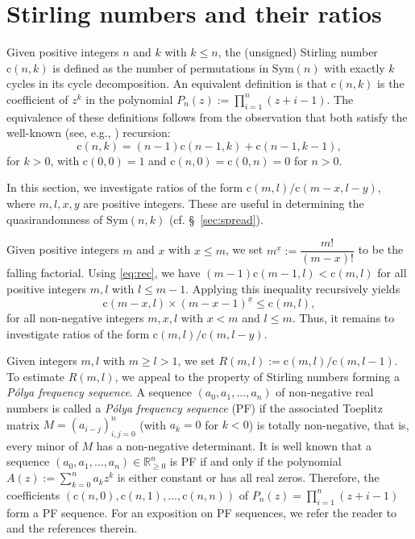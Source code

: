 \documentclass{amsart}
\newcommand{\bb}{\mathbb}
\newcommand{\sym}{\mathrm{Sym}}
\newcommand{\st}{\mathrm{c}}
\newcommand{\ff}[1]{^{\underline{#1}}}
\begin{document}
\section{Stirling numbers and their ratios}\label{sec:stirling}
Given positive integers $n$ and $k$ with $k\leq n$, the (unsigned) Stirling number $\st(n,k)$ is defined as the number of permutations in $\sym(n)$ with exactly $k$ cycles in its cycle decomposition. An equivalent definition is that $\st(n,k)$ is the coefficient of $z^{k}$ in the polynomial $P_{n}(z):=\prod\limits_{i=1}^{n}(z+i-1)$. The equivalence of these definitions follows from the observation that both satisfy the well-known (see, e.g., \cite[Lemma 1.3.6]{stanley2011enumerative}) recursion:
\begin{equation}\label{eq:rec}
\st(n,k) = (n-1)\st(n-1,k) + \st(n-1,k-1),     
\end{equation}
for $k>0$, with $\st(0,0)=1$ and $\st(n,0)=\st(0,n)=0$ for $n>0$.

In this section, we investigate ratios of the form $\st(m,l)/\st(m-x,l-y)$, where $m,l,x,y$ are positive integers. These are useful in determining the quasirandomness of $\sym(n,k)$ (cf. \S~\ref{sec:spread}).

Given positive integers $m$ and $x$ with $x\leq m$, we set $m\ff{x}:=\dfrac{m!}{(m-x)!}$ to be the falling factorial. Using \eqref{eq:rec}, we have $(m-1)\st(m-1,l)<\st(m,l)$ for all positive integers $m,l$ with $l\leq m-1$. Applying this inequality recursively yields
\begin{equation}\label{eq:changenumineq}
\st(m-x,l)\times (m-x-1)\ff{x} \leq \st(m,l),
\end{equation} 
for all non-negative integers $m,x,l$ with $x< m$ and $l\leq m$. Thus, it remains to investigate ratios of the form $\st(m,l)/\st(m,l-y)$. 

Given integers $m,l$ with $m\geq l>1$, we set $R(m,l):=\st(m,l)/\st(m,l-1)$. 
To estimate $R(m,l)$, we appeal to the property of Stirling numbers forming a {\it P\'{o}lya frequency sequence}. A sequence $(a_{0},a_{1},\ldots,a_{n})$ of non-negative real numbers is called a {\it P\'{o}lya frequency sequence} (PF) if the associated Toeplitz matrix $M=(a_{i-j})_{i,j=0}^{n}$ (with $a_{k}=0$ for $k<0$) is totally non-negative, that is, every minor of $M$ has a non-negative determinant. It is well known that a sequence $(a_{0},a_{1},\ldots,a_{n}) \in \bb{R}_{\geq 0}^{n}$ is PF if and only if the polynomial $A(z):=\sum\limits_{k=0}^{n}a_{k}z^{k}$ is either constant or has all real zeros. Therefore, the coefficients $\left(\st(n,0), \st(n,1), \ldots, \st(n,n) \right)$ of $P_{n}(z)=\prod\limits_{i=1}^{n}(z+i-1)$ form a PF sequence. For an exposition on PF sequences, we refer the reader to \cite{Unimodsurvey} and the references therein.
\end{document}
